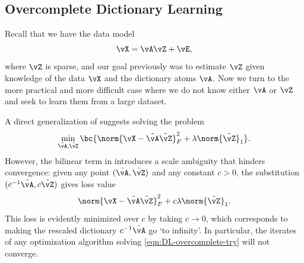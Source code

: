 \documentclass[../../book-main.tex]{subfiles}
\begin{document}
    \subsection{Overcomplete Dictionary Learning}

    Recall that we have the data model
    \begin{equation}\label{eq:overcomplete-dl-section-data-model}
        \vX = \vA\vZ + \vE,
    \end{equation}
    where \(\vZ\) is sparse, and our goal previously was to estimate
    \(\vZ\) given
    knowledge of the data \(\vX\) and the dictionary atoms \(\vA\).
    Now we turn to
    the more practical and more difficult case where we do not know
    either \(\vA\) or \(\vZ\) and seek to learn them from a large dataset.

    A direct generalization of  suggests
    solving the problem
    \begin{equation}
        \min_{\tilde{\vA}, \tilde{\vZ}}\bc{\norm{\vX -
        \tilde{\vA}\tilde{\vZ}}_{F}^{2} + \lambda \norm{\tilde{\vZ}}_{1}}.
        \label{eqn:DL-overcomplete-try}
    \end{equation}
    However, the bilinear term in 
    introduces a scale
    ambiguity that hinders convergence: given any point $(\tilde{\vA},
    \tilde{\vZ})$ and any constant $c>0$, the substitution
    $(c^{-1}\tilde{\vA}, c\tilde{\vZ})$ gives loss value
    \begin{equation}
        \norm{\vX - \tilde{\vA}\tilde{\vZ}}_{F}^{2} + c\lambda
        \norm{\tilde{\vZ}}_{1}.
    \end{equation}
    This loss is evidently minimized over $c$ by taking $c \to 0$,
    which corresponds
    to making the rescaled dictionary $c^{-1} \tilde{\vA}$ go `to infinity'. In
    particular, the iterates of any optimization algorithm solving
    \eqref{eqn:DL-overcomplete-try} will not converge.
\end{document}
